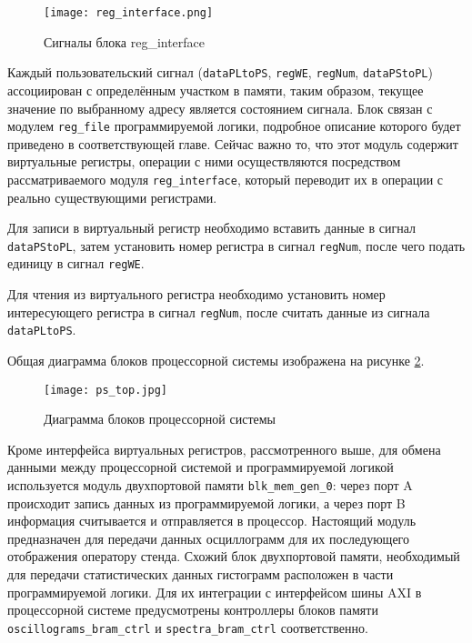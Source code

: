 \begin{figure}[ht]
    \centering
    \texttt{[image: reg\_interface.png]}
    \caption{Сигналы блока reg\_interface}
    \label{fig:reg_interface}
\end{figure}
Каждый пользовательский сигнал (\texttt{dataPLtoPS}, \texttt{regWE}, \texttt{regNum}, \texttt{dataPStoPL}) ассоциирован с определённым участком в памяти, таким образом, текущее значение по выбранному адресу является состоянием сигнала. Блок связан с модулем \texttt{reg\_file} программируемой логики, подробное описание которого будет приведено в соответствующей главе. Сейчас важно то, что этот модуль содержит виртуальные регистры, операции с ними осуществляются посредством рассматриваемого модуля \texttt{reg\_interface}, который переводит их в операции с реально существующими регистрами.\par
Для записи в виртуальный регистр необходимо вставить данные в сигнал \texttt{dataPStoPL}, затем установить номер регистра в сигнал \texttt{regNum}, после чего подать единицу в сигнал \texttt{regWE}.\par
Для чтения из виртуального регистра необходимо установить номер интересующего регистра в сигнал \texttt{regNum}, после считать данные из сигнала \texttt{dataPLtoPS}.\par
Общая диаграмма блоков процессорной системы изображена на рисунке \ref{fig:ps_top}.\par
\begin{figure}[ht]
    \centering
    \texttt{[image: ps\_top.jpg]}
    \caption{Диаграмма блоков процессорной системы}
    \label{fig:ps_top}
\end{figure}
Кроме интерфейса виртуальных регистров, рассмотренного выше, для обмена данными между процессорной системой и программируемой логикой используется модуль двухпортовой памяти \texttt{blk\_mem\_gen\_0}: через порт A происходит запись данных из программируемой логики, а через порт B информация считывается и отправляется в процессор. Настоящий модуль предназначен для передачи данных осциллограмм для их последующего отображения оператору стенда. Схожий блок двухпортовой памяти, необходимый для передачи статистических данных гистограмм расположен в части программируемой логики. Для их интеграции с интерфейсом шины AXI в процессорной системе предусмотрены контроллеры блоков памяти \texttt{oscillograms\_bram\_ctrl} и \texttt{spectra\_bram\_ctrl} соответственно.\par

